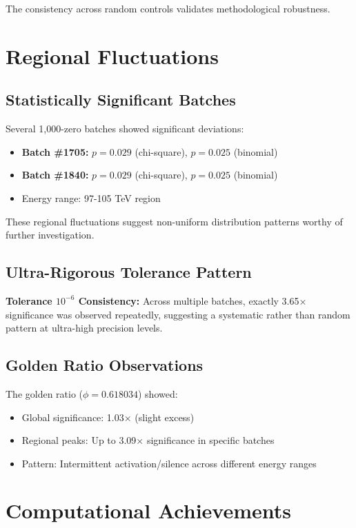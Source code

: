 \documentclass[12pt, a4paper]{article}
\begin{document}
The consistency across random controls validates methodological robustness.

\section{Regional Fluctuations}

\subsection{Statistically Significant Batches}
Several 1,000-zero batches showed significant deviations:
\begin{itemize}
    \item \textbf{Batch \#1705:} $p = 0.029$ (chi-square), $p = 0.025$ (binomial)
    \item \textbf{Batch \#1840:} $p = 0.029$ (chi-square), $p = 0.025$ (binomial)
    \item Energy range: 97-105 TeV region
\end{itemize}

These regional fluctuations suggest non-uniform distribution patterns worthy of further investigation.

\subsection{Ultra-Rigorous Tolerance Pattern}
\textbf{Tolerance $10^{-6}$ Consistency:}
Across multiple batches, exactly 3.65× significance was observed repeatedly, suggesting a systematic rather than random pattern at ultra-high precision levels.

\subsection{Golden Ratio Observations}
The golden ratio ($\phi = 0.618034$) showed:
\begin{itemize}
    \item Global significance: 1.03× (slight excess)
    \item Regional peaks: Up to 3.09× significance in specific batches
    \item Pattern: Intermittent activation/silence across different energy ranges
\end{itemize}

\section{Computational Achievements}
\end{document}
